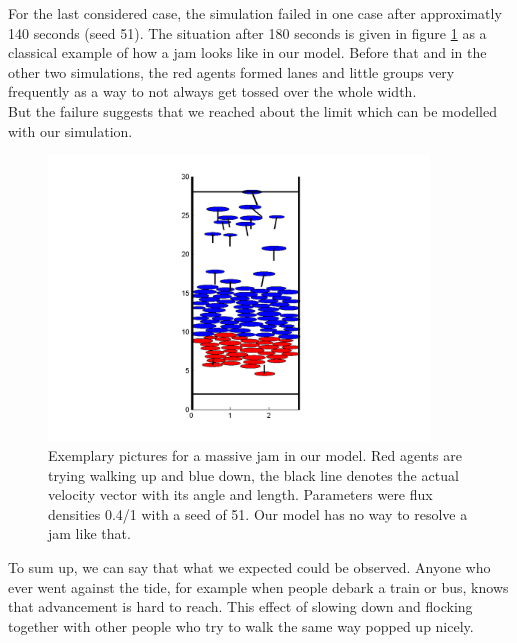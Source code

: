 \noi For the last considered case, the simulation failed in one case after approximatly 140 seconds (seed 51). The situation after 180 seconds is given in figure \ref{fig:up1down03seed51} as a classical example of how a jam looks like in our model. Before that and in the other two simulations, the red agents formed lanes and little groups very frequently as a way to not always get tossed over the whole width.\\
But the failure suggests that we reached about the limit which can be modelled with our simulation.\\

\begin{figure}[h!]
	\centering
		\includegraphics[width=0.90\textwidth]{pictures/up1down04seed51.png}
	\caption{Exemplary pictures for a massive jam in our model. Red agents are trying walking up and blue down, the black line denotes the actual velocity vector with its angle and length. Parameters were flux densities 0.4/1 with a seed of 51. Our model has no way to resolve a jam like that.}
	\label{fig:up1down03seed51}
\end{figure}

\noi To sum up, we can say that what we expected could be observed. Anyone who ever went against the tide, for example when people debark a train or bus, knows that advancement is hard to reach. This effect of slowing down and flocking together with other people who try to walk the same way popped up nicely.\\